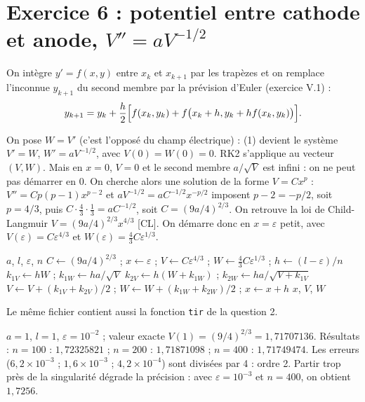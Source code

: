 \section{\texorpdfstring{Exercice 6 : potentiel entre cathode et anode, $V'' = aV^{-1/2}$}{Exercice 6 : potentiel entre cathode et anode, V'' = a V\textasciicircum (-1/2)}}

\Pourquoi On intègre $y' = f(x,y)$ entre $x_k$ et $x_{k+1}$ par les trapèzes et on
remplace l'inconnue $y_{k+1}$ du second membre par la prévision d'Euler
(exercice V.1) :
\[
  y_{k+1} = y_k + \frac h2\Bigl[f(x_k, y_k) + f\bigl(x_k + h, y_k + hf(x_k, y_k)\bigr)\Bigr].
\]

\Pourquoi On pose $W = V'$ (c'est l'opposé du champ électrique) : (1) devient le
système $V' = W$, $W' = aV^{-1/2}$, avec $V(0) = W(0) = 0$. RK2 s'applique au
vecteur $(V, W)$. Mais en $x = 0$, $V = 0$ et le second membre $a/\sqrt{V}$
est infini : on ne peut pas démarrer en $0$. On cherche alors une solution de
la forme $V = Cx^{p}$ : $V'' = Cp(p-1)x^{p-2}$ et $aV^{-1/2} = aC^{-1/2}x^{-p/2}$
imposent $p - 2 = -p/2$, soit $p = 4/3$, puis $C\cdot\frac43\cdot\frac13 =
aC^{-1/2}$, soit $C = (9a/4)^{2/3}$. On retrouve la loi de Child-Langmuir
$V = (9a/4)^{2/3}x^{4/3}$ [CL]. On démarre donc en $x = \varepsilon$ petit, avec
$V(\varepsilon) = C\varepsilon^{4/3}$ et
$W(\varepsilon) = \frac43C\varepsilon^{1/3}$.

\begin{algo}[ : RK2 pour $V'' = aV^{-1/2}$]
  \Require $a$, $l$, $\varepsilon$, $n$
  \State $C \leftarrow (9a/4)^{2/3}$ ; $x \leftarrow \varepsilon$ ; $V \leftarrow C\varepsilon^{4/3}$ ;
         $W \leftarrow \frac43C\varepsilon^{1/3}$ ; $h \leftarrow (l - \varepsilon)/n$
    \State $k_{1V} \leftarrow hW$ ; $k_{1W} \leftarrow ha/\sqrt{V}$
    \State $k_{2V} \leftarrow h(W + k_{1W})$ ; $k_{2W} \leftarrow ha/\sqrt{V + k_{1V}}$
    \State $V \leftarrow V + (k_{1V} + k_{2V})/2$ ; $W \leftarrow W + (k_{1W} + k_{2W})/2$ ; $x \leftarrow x + h$
    \Print $x$, $V$, $W$
  \EndFor
\end{algo}

Le même fichier contient aussi la fonction \texttt{tir} de la question 2.

\Verif $a = 1$, $l = 1$, $\varepsilon = 10^{-2}$ ; valeur exacte
$V(1) = (9/4)^{2/3} = 1{,}71707136$. Résultats : $n = 100$ : $1{,}72325821$ ;
$n = 200$ : $1{,}71871098$ ; $n = 400$ : $1{,}71749474$.
Les erreurs ($6{,}2\times 10^{-3}$ ; $1{,}6\times 10^{-3}$ ;
$4{,}2\times 10^{-4}$) sont divisées par 4 : ordre 2. Partir trop près de la
singularité dégrade la précision : avec $\varepsilon = 10^{-3}$ et $n = 400$,
on obtient $1{,}7256$.

